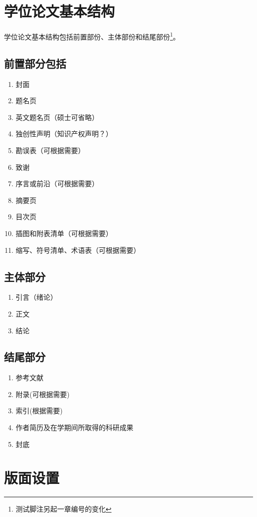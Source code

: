 \chapter{学位论文基本结构}
学位论文基本结构包括前置部份、主体部份和结尾部份\footnote{测试脚注另起一章编号的变化}。
\section{前置部分包括}
\begin{enumerate}
	\item 封面
	\item 题名页
	\item 英文题名页（硕士可省略）
	\item 独创性声明（知识产权声明？）
	\item 勘误表（可根据需要）
	\item 致谢
	\item 序言或前沿（可根据需要）
	\item 摘要页
	\item 目次页
	\item 插图和附表清单（可根据需要）
	\item 缩写、符号清单、术语表（可根据需要）
\end{enumerate}
\section{主体部分}
\begin{enumerate}
	\item 引言（绪论）
	\item 正文
	\item 结论
\end{enumerate}
\section{结尾部分}
\begin{enumerate}
	\item 参考文献
	\item 附录(可根据需要)
	\item 索引(根据需要)
	\item 作者简历及在学期间所取得的科研成果
	\item 封底
\end{enumerate}
\chapter{版面设置}
